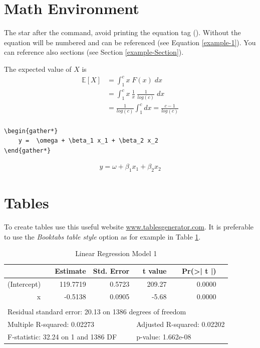 \section{Math Environment}

The star after the command, avoid printing the equation tag (). Without the equation will be numbered and can be referenced (see Equation \eqref{example-1}). You can reference also sections (see Section \ref{example-Section}).

The expected value of $X$ is
\begin{align*}
	\mathbb{E}[X] &= \int_{1}^{c} x \; F(x) \; dx \\[0.25cm]
				  &= \int_{1}^{c} x \ \frac{1}{x} \ \frac{1}{log(c)} \; dx \\[0.25cm]
				  &= \frac{1}{log(c)} \int_{1}^{c} dx = \frac{c - 1}{log(c)} \\
	\label{example-1}			  
\end{align*}

\begin{verbatim}
\begin{gather*}
	y =  \omega + \beta_1 x_1 + \beta_2 x_2
\end{gather*}
\end{verbatim}
\begin{gather*}
	y =  \omega + \beta_1 x_1 + \beta_2 x_2
\end{gather*}

\section{Tables}

To create tables use this useful website \href{http://www.tablesgenerator.com}{www.tablesgenerator.com}. It is preferable to use the \textit{Booktabs table style} option as for example in Table \ref{tab:regression}.

\begin{table}[!h]
\centering
\caption{Linear Regression Model 1}
\label{tab:regression}
\begin{tabular}{@{}llrrlrl@{}}
\toprule
\multicolumn{1}{r}{\textbf{}} &  & \textbf{Estimate} & \textbf{Std. Error} & \multicolumn{1}{r}{\textbf{t value}} & \textbf{Pr(\textgreater | t |)} & \textbf{} \\ \midrule
\multicolumn{1}{r}{(Intercept)} &  & 119.7719 & 0.5723 & \multicolumn{1}{r}{209.27} & 0.0000 &  \\
\multicolumn{1}{r}{x} &  & -0.5138 & 0.0905 & \multicolumn{1}{r}{-5.68} & 0.0000 &  \\
 &  & \multicolumn{1}{l}{} & \multicolumn{1}{l}{} &  & \multicolumn{1}{l}{} &  \\
\multicolumn{7}{l}{Residual standard error: 20.13 on 1386 degrees of freedom} \\
\multicolumn{4}{l}{Multiple R-squared: 0.02273} & \multicolumn{3}{l}{Adjusted R-squared: 0.02202} \\
\multicolumn{4}{l}{F-statistic: 32.24 on 1 and 1386 DF} & \multicolumn{3}{l}{p-value: 1.662e-08} \\ \bottomrule
\end{tabular}
\end{table}

